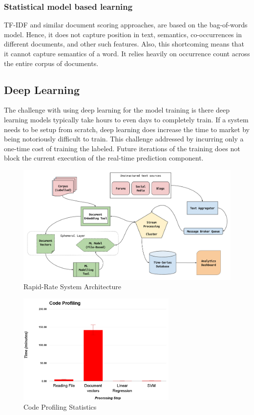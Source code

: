 \documentclass[conference]{IEEEtran}
\begin{document}
        \subsubsection{Statistical model based learning}
        TF-IDF and similar document scoring approaches, are based on the bag-of-words model. Hence, it does not capture position in text, semantics, co-occurrences in different documents, and other such features. Also, this shortcoming means that it cannot capture semantics of a word. It relies heavily on occurrence count across the entire corpus of documents.

    \subsection{Deep Learning}
        The challenge with using deep learning for the model training is there deep learning models typically take hours to even days to completely train. If a system needs to be setup from scratch, deep learning does increase the time to market by being notoriously difficult to train. This challenge addressed by incurring only a one-time cost of training the labeled. Future iterations of the training does not block the current execution of the real-time prediction component.

\vspace{5mm}

\begin{figure}[ht] \label{fig:system-architecture}
    \centering
    \includegraphics[width=\textwidth]{images/rapid_rate_system_arch_1.png}
    \caption{Rapid-Rate System Architecture}
\end{figure}

\begin{figure}[ht] \label{fig:code-profiling}
    \centering
    \includegraphics[width=0.7\textwidth]{images/code_profiling.png}
    \caption{Code Profiling Statistics}
\end{figure}
\end{document}
